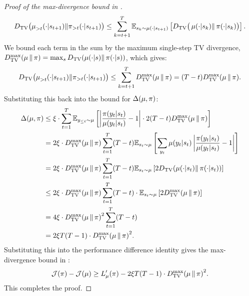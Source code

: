 \begin{proof}[Proof of the max-divergence bound in ]
\begin{equation*}  
D_{\mathrm{TV}}\big({\rolloutpi}_{>t}(\cdot|s_{t+1}) \|  {\trainerpi}_{>t}(\cdot|s_{t+1})\big) \le \sum_{k=t+1}^{T} \mathbb{E}_{s_k \sim \rolloutpi(\cdot|s_{t+1})} \left[ D_{\mathrm{TV}}\big(\rolloutpi(\cdot|s_k) \|  \trainerpi(\cdot|s_k)\big) \right].  
\end{equation*}  
We bound each term in the sum by the maximum single-step TV divergence, $D_{\mathrm{TV}}^{\max}(\rolloutpi \|  \trainerpi) = \max_{s} D_{\mathrm{TV}}(\rolloutpi(\cdot|s) \|  \trainerpi(\cdot|s))$, which gives:  
\begin{equation*}  
D_{\mathrm{TV}}\big({\rolloutpi}_{>t}(\cdot|s_{t+1}) \|  {\trainerpi}_{>t}(\cdot|s_{t+1})\big) \le \sum_{k=t+1}^{T} D_{\mathrm{TV}}^{\max}(\rolloutpi \|  \trainerpi) = (T-t) D_{\mathrm{TV}}^{\max}(\rolloutpi \|  \trainerpi).  
\end{equation*}  
Substituting this back into the bound for $\Delta(\rolloutpi, \trainerpi)$:  
\begin{align}
\label{eq:delta_bound_final}
\begin{split}
\Delta(\rolloutpi, \trainerpi) &\le \xi \cdot \sum_{t=1}^{T} \mathbb{E}_{y_{\le t} \sim \rolloutpi} \left[ \left| \frac{\trainerpi(y_t|s_t)}{\rolloutpi(y_t|s_t)} - 1 \right| \cdot 2(T-t) D_{\mathrm{TV}}^{\max}(\rolloutpi \|  \trainerpi) \right] \\  
&= 2\xi \cdot D_{\mathrm{TV}}^{\max}(\rolloutpi \|  \trainerpi) \sum_{t=1}^{T} (T-t) \mathbb{E}_{s_t \sim \rolloutpi} \left[ \sum_{y_t} \rolloutpi(y_t|s_t) \left| \frac{\trainerpi(y_t|s_t)}{\rolloutpi(y_t|s_t)} - 1 \right| \right] \\
&= 2\xi \cdot D_{\mathrm{TV}}^{\max}(\rolloutpi \|  \trainerpi) \sum_{t=1}^{T} (T-t) \mathbb{E}_{s_t \sim \rolloutpi} \left[ 2 D_{\mathrm{TV}}(\rolloutpi(\cdot|s_t) \|  \trainerpi(\cdot|s_t)) \right] \\
&\le 2\xi \cdot D_{\mathrm{TV}}^{\max}(\rolloutpi \|  \trainerpi) \sum_{t=1}^{T} (T-t) \cdot \mathbb{E}_{s_t \sim \rolloutpi} \left[ 2 D_{\mathrm{TV}}^{\max}(\rolloutpi \|  \trainerpi) \right] \\  
&= 4\xi \cdot {D_{\mathrm{TV}}^{\max}(\rolloutpi \|  \trainerpi)}^2 \sum_{t=1}^{T} (T-t) \\
&= 2\xi T(T-1) \cdot {D_{\mathrm{TV}}^{\max}(\rolloutpi \|  \trainerpi)}^2.  
\end{split}
\end{align}  
Substituting this into the performance difference identity gives the max-divergence bound in :
\begin{equation*}  
\mathcal{J}(\trainerpi) - \mathcal{J}(\rolloutpi) \ge L_{\rolloutpi}'(\trainerpi) - 2\xi T(T-1) \cdot {D_{\mathrm{TV}}^{\max}(\rolloutpi \|  \trainerpi)}^2.  
\end{equation*}  
This completes the proof.  
\end{proof}

